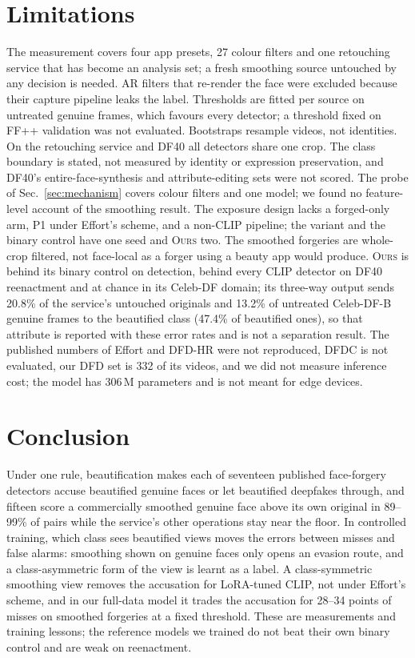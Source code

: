 \documentclass[conference]{IEEEtran}
\newcommand{\ours}{\textsc{Ours}}
\begin{document}
\section{Limitations}
The measurement covers four app presets, 27 colour filters and one retouching service that has become an analysis set; a fresh
smoothing source untouched by any decision is needed. AR filters that re-render the face were excluded because their capture
pipeline leaks the label. Thresholds are fitted per source on untreated genuine frames, which favours every detector; a
threshold fixed on FF++ validation was not evaluated. Bootstraps resample videos, not identities. On the retouching service and
DF40 all detectors share one crop. The class boundary is stated, not measured by identity or expression preservation, and
DF40's entire-face-synthesis and attribute-editing sets were not scored. The probe of Sec.~\ref{sec:mechanism} covers colour
filters and one model; we found no feature-level account of the smoothing result. The exposure design lacks a forged-only arm,
P1 under Effort's scheme, and a non-CLIP pipeline; the variant and the binary control have one seed and \ours{} two. The
smoothed forgeries are whole-crop filtered, not face-local as a forger using a beauty app would produce. \ours{} is behind its
binary control on detection, behind every CLIP detector on DF40 reenactment and at chance in its Celeb-DF domain; its three-way
output sends 20.8\% of the service's untouched originals and 13.2\% of untreated Celeb-DF-B genuine frames to the beautified
class (47.4\% of beautified ones), so that attribute is reported with these error rates and is not a separation result. The
published numbers of Effort and DFD-HR were not reproduced, DFDC is not evaluated, our DFD set is 332 of its videos, and we did
not measure inference cost; the model has 306\,M parameters and is not meant for edge devices.

\section{Conclusion}
Under one rule, beautification makes each of seventeen published face-forgery detectors accuse beautified genuine faces or let
beautified deepfakes through, and fifteen score a commercially smoothed genuine face above its own original in 89--99\% of pairs
while the service's other operations stay near the floor. In controlled training, which class sees beautified views moves the
errors between misses and false alarms: smoothing shown on genuine faces only opens an evasion route, and a class-asymmetric form of the view is
learnt as a label. A class-symmetric smoothing view removes the accusation for LoRA-tuned CLIP, not under Effort's scheme, and
in our full-data model it trades the accusation for 28--34 points of misses on smoothed forgeries at a fixed threshold. These
are measurements and training lessons; the reference models we trained do not beat their own binary control and are weak on
reenactment.



\end{document}
